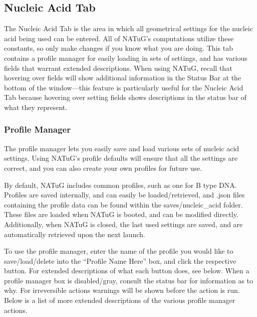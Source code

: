 \documentclass[
titlepage,
fontsize=12pt
]{article}
\begin{document}
	\subsection{Nucleic Acid Tab} \label{sect:nucleic-acid-tab}
	
	The Nucleic Acid Tab is the area in which all geometrical settings for the nucleic acid being used can be entered. All of NATuG’s computations utilize these constants, so only make changes if you know what you are doing. This tab contains a profile manager for easily loading in sets of settings, and has various fields that warrant extended descriptions. When using NATuG, recall that hovering over fields will show additional information in the Status Bar at the bottom of the window---this feature is particularly useful for the Nucleic Acid Tab because hovering over setting fields shows descriptions in the status bar of what they represent.
	
	\subsubsection{Profile Manager}
	
	The profile manager lets you easily save and load various sets of nucleic acid settings. Using NATuG’s profile defaults will ensure that all the settings are correct, and you can also create your own profiles for future use.
	
	By default, NATuG includes common profiles, such as one for B type DNA. Profiles are saved internally, and can easily be loaded/retrieved, and .json files containing the profile data can be found within the saves/nucleic\_acid folder. These files are loaded when NATuG is booted, and can be modified directly. Additionally, when NATuG is closed, the last used settings are saved, and are automatically retrieved upon the next launch.
	
	To use the profile manager, enter the name of the profile you would like to save/load/delete into the “Profile Name Here” box, and click the respective button. For extended descriptions of what each button does, see below. When a profile manager box is disabled/gray, consult the status bar for information as to why. For irreversible actions warnings will be shown before the action is run. Below is a list of more extended descriptions of the various profile manager actions.
	
\end{document}

